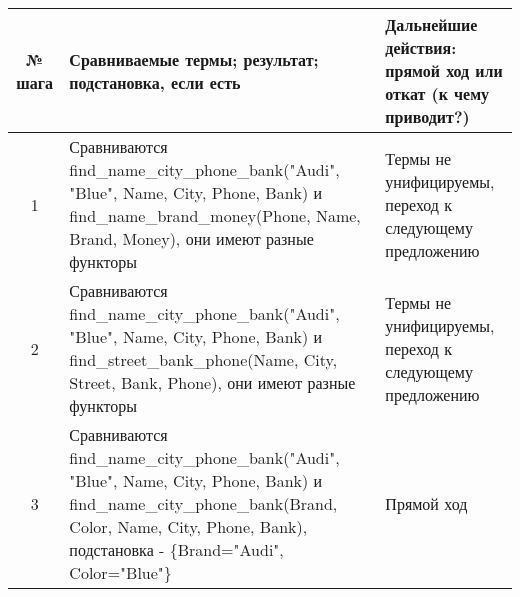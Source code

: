 \documentclass[a4paper,12pt]{article}
\begin{document}
\begin{table}[ht!] 
	\begin{tabularx}{\linewidth}{|c|>{\centering}X|>{\centering}X|}
		\hline
		№ шага & Сравниваемые термы; результат; подстановка, если есть & Дальнейшие действия: прямой ход или откат (к чему приводит?)\tabularnewline
		\hline
		1 & Сравниваются find\_name\_city\_phone\_bank("Audi"{}, "Blue"{}, Name, City, Phone, Bank) и find\_name\_brand\_money(Phone, Name, Brand, Money), они имеют разные функторы & Термы не унифицируемы, переход к следующему предложению \tabularnewline
		\hline
		2 & Сравниваются find\_name\_city\_phone\_bank("Audi"{}, "Blue"{}, Name, City, Phone, Bank) и find\_street\_bank\_phone(Name, City, Street, Bank, Phone), они имеют разные функторы & Термы не унифицируемы, переход к следующему предложению \tabularnewline
		\hline
		3 & Сравниваются find\_name\_city\_phone\_bank("Audi"{}, "Blue"{}, Name, City, Phone, Bank) и find\_name\_city\_phone\_bank(Brand, Color, Name, City, Phone, Bank), подстановка - \{Brand="Audi"{}, Color="Blue"\} & Прямой ход \tabularnewline
		\hline
	\end{tabularx}
\end{table}
\newpage
\end{document}
